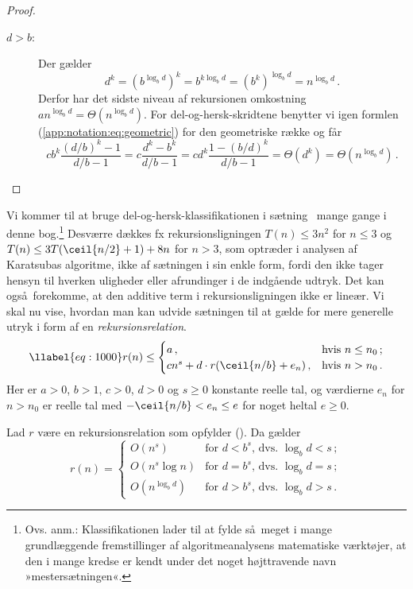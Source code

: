 \begin{proof}
\begin{description}
\item[$d>b$:] Der gælder
  \[ d^k
  =(b^{\log_b d})^k
  =b^{k\log_b d}
  =(b^k)^{\log_b d}
  =n^{\log_b d}\,. \]
  Derfor har det sidste niveau af rekursionen omkostning $an^{\log_b d}=\Theta(n^{\log_b d})$.
      For del-og-hersk-skridtene benytter vi igen formlen (\ref{app:notation:eq:geometric}) for den geometriske række og får 
  \begin{equation}
    cb^k\frac{(d/b)^k-1}{d/b-1} =
    c\frac{d^k-b^k}{d/b-1} =
    cd^k\frac{1-(b/d)^k}{d/b-1} =
    \Theta(d^k) =
    \Theta(n^{\log_b d})\,. 
  \end{equation}
  \end{description}
\end{proof}

Vi kommer til at bruge del-og-hersk-klassifikationen i sætning~ mange gange i denne bog.\footnote{Ovs. anm.: 
Klassifikationen lader til at fylde så meget i mange grundlæggende fremstillinger af algoritmeanalysens matematiske værktøjer, at den i mange kredse er kendt under det noget højttravende navn »mestersætningen«.} 
Desværre dækkes fx rekursionsligningen $T(n) \le 3n^2$ for $n \le 3$ og  $T(n) \le 3T(\ceil{n/2} + 1) + 8n$ for $n>3$, som optræder i analysen af Karatsubas algoritme, ikke af sætningen i sin enkle form, fordi den ikke tager hensyn til hverken uligheder eller afrundinger i de indgående udtryk.
Det kan også forekomme, at den additive term i rekursionsligningen ikke er lineær.
Vi skal nu vise, hvordan man kan udvide sætningen til at gælde for mere generelle utryk i form af en 
\emph{rekursionsrelation}.
%
\begin{equation}
  \llabel{eq:1000}
  r(n)\leq
  \begin{cases}
    a\,, & \text{hvis }n\leq n_0\,;\\
    cn^s + d \cdot r(\ceil{n/b} + e_n)\,, & \text{hvis } n > n_0\,.
  \end{cases}
\end{equation} 
Her er $a>0$, $b>1$, $c>0$, $d>0$ og $s\ge 0$ konstante reelle tal, og  værdierne $e_n$ for $n>n_0$ er reelle tal med $-\ceil{n/b} < e_n \le e$ for noget heltal $e\ge0$.
%
\addtocounter{theorem}{-1}
\begin{thm}
  Lad $r$ være en rekursionsrelation som opfylder ().
  Da gælder
\[ r(n)=
\begin{cases}
O(n^s) & \text{for $d < b^s$, dvs. $\log_b d < s$}\,;\\
O(n^s\log n) & \text{for $d = b^s$, dvs. $\log_b d = s$}\,;\\
  O(n^{\log_bd}) & \text{for $d > b^s$, dvs. $\log_b d > s$}\,.
\end{cases} \]
\end{thm}

